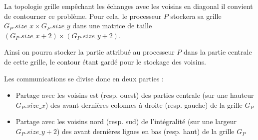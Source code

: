 \documentclass{article}
\begin{document}
\par La topologie grille empêchant les échanges avec les voisins en diagonal il convient de contourner ce problème. Pour cela, le processeur $P$ stockera sa grille $G_P.size\_x \times G_P.size\_y$ dans une matrice de taille $(G_P.size\_x+2) \times (G_P.size\_y+2)$.
\par Ainsi on pourra stocker la partie attribué au processeur $P$ dans la partie centrale de cette grille, le contour étant gardé pour le stockage des voisins.

\par Les communications se divise donc en deux parties :
\begin{itemize}
	\item Partage avec les voisins est (resp. ouest) des parties centrale (sur une hauteur $G_P.size\_x$) des avant dernières colonnes à droite (resp. gauche) de la grille $G_P$
	\item Partage avec les voisins nord (resp. sud) de l'intégralité (sur une largeur $G_P.size\_y+2$) des avant dernières lignes en bas (resp. haut) de la grille $G_P$
\end{itemize}
\end{document}
